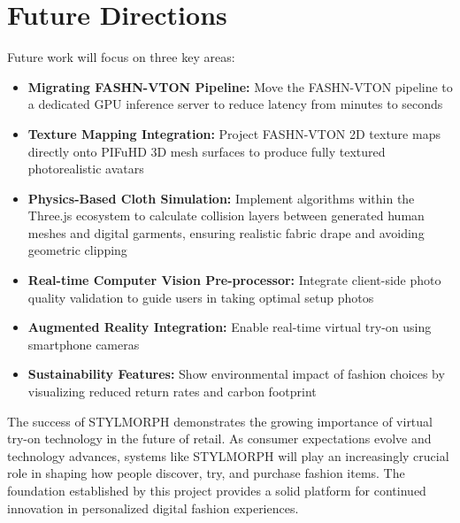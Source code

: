 \documentclass[12pt,a4paper,oneside]{report}
\begin{document}
\section{Future Directions}

Future work will focus on three key areas:

\begin{itemize}
    \item \textbf{Migrating FASHN-VTON Pipeline:} Move the FASHN-VTON pipeline to a dedicated GPU inference server to reduce latency from minutes to seconds
    \item \textbf{Texture Mapping Integration:} Project FASHN-VTON 2D texture maps directly onto PIFuHD 3D mesh surfaces to produce fully textured photorealistic avatars
    \item \textbf{Physics-Based Cloth Simulation:} Implement algorithms within the Three.js ecosystem to calculate collision layers between generated human meshes and digital garments, ensuring realistic fabric drape and avoiding geometric clipping
    \item \textbf{Real-time Computer Vision Pre-processor:} Integrate client-side photo quality validation to guide users in taking optimal setup photos
    \item \textbf{Augmented Reality Integration:} Enable real-time virtual try-on using smartphone cameras
    \item \textbf{Sustainability Features:} Show environmental impact of fashion choices by visualizing reduced return rates and carbon footprint
\end{itemize}

The success of STYLMORPH demonstrates the growing importance of virtual try-on technology in the future of retail. As consumer expectations evolve and technology advances, systems like STYLMORPH will play an increasingly crucial role in shaping how people discover, try, and purchase fashion items. The foundation established by this project provides a solid platform for continued innovation in personalized digital fashion experiences.
\end{document}
